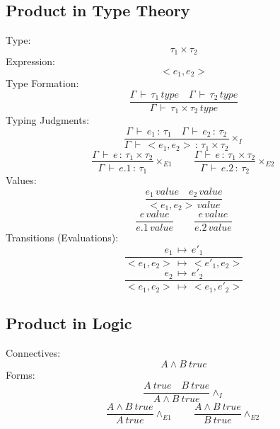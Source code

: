 \documentclass{article}
\begin{document}
\subsection*{Product in Type Theory}
Type: 
\begin{equation*}
\tau_{1}\times\tau_{2}
\end{equation*}
Expression: 
\begin{equation*}
<e_{1},e_{2}>
\end{equation*}
Type Formation: 
\begin{equation*}
\frac{\Gamma\,\vdash\,\tau_{1}\,type\quad\Gamma\,\vdash\,\tau_{2}\,type}
{\Gamma\,\vdash\,\tau_{1}\times\tau_{2}\,type}
\end{equation*}
Typing Judgments:
\begin{equation*}
\frac{\Gamma\,\vdash\,e_{1}\,:\,\tau_{1}\quad\Gamma\,\vdash\,e_{2}\,:\,\tau_{2}}
{\Gamma\,\vdash\,<e_{1},e_{2}>\,:\,\tau_{1}\times\tau_{2}}\times_{I}\tag{Introduction Form}
\end{equation*}
\begin{equation*}
\frac{\Gamma\,\vdash\,e\,:\,\tau_{1}\times\tau_{2}}
{\Gamma\,\vdash\,e.1\,:\,\tau_{1}}\times_{E1}
\qquad 
\frac{\Gamma\,\vdash\,e\,:\,\tau_{1}\times\tau_{2}}
{\Gamma\,\vdash\,e.2\,:\,\tau_{2}}\times_{E2}
\tag{Elimination Form}
\end{equation*}
Values:
\begin{equation*}
\frac{e_{1}\,value\quad e_{2}\,value}
{<e_{1},e_{2}>\,value}
\end{equation*}
\begin{equation*}
\frac{e\,value}
{e.1\,value}
\qquad 
\frac{e\,value}
{e.2\,value}
\end{equation*}
Transitions (Evaluations):
\begin{equation*}
\frac{e_{1}\,\mapsto\,e'_{1}}
{<e_{1},e_{2}>\,\mapsto\,<e'_{1},e_{2}>}
\end{equation*}
\begin{equation*}
\frac{e_{2}\,\mapsto\,e'_{2}}
{<e_{1},e_{2}>\,\mapsto\,<e_{1},e'_{2}>}
\end{equation*}

\subsection*{Product in Logic}
Connectives:
\begin{equation*}
A \wedge B\ true
\end{equation*}
Forms:
\begin{equation*}
\frac{A\ true \quad B\ true}
{A \wedge B\ true}\wedge_{I}\tag{Introduction Form}
\end{equation*}
\begin{equation*}
\frac{A \wedge B\ true}
{A\ true}\wedge_{E1}
\qquad
\frac{A \wedge B\ true}
{B\ true}\wedge_{E2}
\tag{Elimination Form}
\end{equation*}
\end{document}
